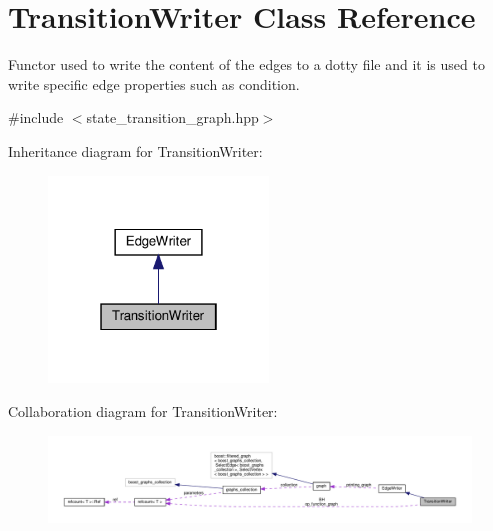 \hypertarget{classTransitionWriter}{}\section{Transition\+Writer Class Reference}
\label{classTransitionWriter}


Functor used to write the content of the edges to a dotty file and it is used to write specific edge properties such as condition.  




{\ttfamily \#include $<$state\+\_\+transition\+\_\+graph.\+hpp$>$}



Inheritance diagram for Transition\+Writer\+:
\nopagebreak
\begin{figure}[H]
\begin{center}
\leavevmode
\includegraphics[width=166pt]{d5/dd2/classTransitionWriter__inherit__graph}
\end{center}
\end{figure}


Collaboration diagram for Transition\+Writer\+:
\nopagebreak
\begin{figure}[H]
\begin{center}
\leavevmode
\includegraphics[width=350pt]{d1/d47/classTransitionWriter__coll__graph}
\end{center}
\end{figure}
